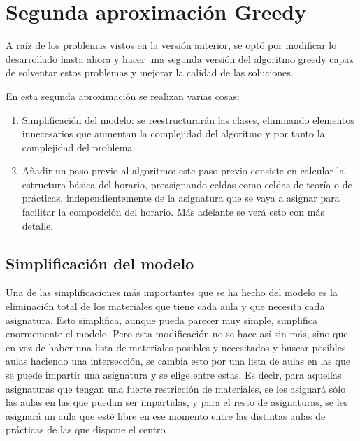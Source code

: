 \chapter{Segunda aproximación Greedy}

A raíz de los problemas vistos en la versión anterior, se optó por modificar lo desarrollado hasta ahora y hacer una segunda versión del algoritmo greedy capaz de solventar estos problemas y mejorar la calidad de las soluciones. 

En esta segunda aproximación se realizan varias cosas:

\begin{enumerate}
  \item Simplificación del modelo: se reestructurarán las clases, eliminando elementos innecesarios que aumentan la complejidad del algoritmo y por tanto la complejidad del problema. 
  \item Añadir un paso previo al algoritmo: este paso previo consiste en calcular la estructura básica del horario, preasignando celdas como celdas de teoría o de prácticas, independientemente de la asignatura que se vaya a asignar para facilitar la composición del horario. Más adelante se verá esto con más detalle.
\end{enumerate}

\section{Simplificación del modelo}

Una de las simplificaciones más importantes que se ha hecho del modelo es la eliminación total de los materiales que tiene cada aula y que necesita cada asignatura. Esto simplifica, aunque pueda parecer muy simple, simplifica enormemente el modelo. Pero esta modificación no se hace así sin más, sino que en vez de haber una lista de materiales posibles y necesitados y buscar posibles aulas haciendo una intersección, se cambia esto por una lista de aulas en las que se puede impartir una asignatura y se elige entre estas. Es decir, para aquellas asignaturas que tengan una fuerte restricción de materiales, se les asignará sólo las aulas en las que puedan ser impartidas, y para el resto de asignaturas, se les asignará un aula que esté libre en ese momento entre las distintas aulas de prácticas de las que dispone el centro

